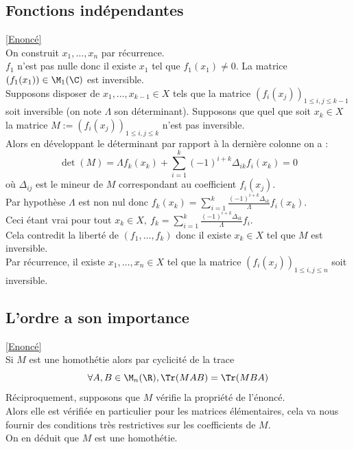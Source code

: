 \documentclass[8pt]{book}
\begin{document}
	\subsection{Fonctions indépendantes }
	\label{Fonctions indépendantes corrigé}
	\textcolor{blue}{\hyperref[Fonctions indépendantes]{[Enoncé]}}\\
	On construit $x_1,\dots,x_n$ par récurrence.\\
	$f_1$ n'est pas nulle donc il existe $x_1$ tel que $f_1(x_1)\ne 0$. La matrice $(f_1(x_1))\in \M_1(\C)$ est inversible.\\
	Supposons disposer de $x_1,\dots,x_{k-1}\in X$ tels que la matrice $(f_i(x_j))_{1\leq i,j\leq k-1}$ soit inversible (on note $\Lambda$ son déterminant). Supposons que quel que soit $x_k\in X$ la matrice $M:=(f_i(x_j))_{1\leq i,j\leq k}$ n'est pas inversible.\\
	Alors en développant le déterminant par rapport à la dernière colonne on a :
	$$\det(M)=\Lambda f_k(x_k)+\sum_{i=1}^k(-1)^{i+k}\Delta_{ik}f_i(x_k)=0$$
	où $\Delta_{ij}$ est le mineur de $M$ correspondant au coefficient $f_i(x_j)$.\\
	Par hypothèse $\Lambda$ est non nul donc $f_k(x_k)=\displaystyle\sum_{i=1}^k\frac{(-1)^{i+k}\Delta_{ik}}{\Lambda}f_i(x_k)$.\\
	Ceci étant vrai pour tout $x_k\in X,\ f_k=\displaystyle\sum_{i=1}^k\frac{(-1)^{i+k}\Delta_{ik}}{\Lambda}f_i$.\\
	Cela contredit la liberté de $(f_1,\dots,f_k)$ donc il existe $x_k\in X$ tel que $M$ est inversible.\\
	Par récurrence, il existe $x_1,\dots,x_n\in X$ tel que la matrice $(f_i(x_j))_{1\leq i,j\leq n}$ soit inversible.
	
	\subsection{L'ordre a son importance }
	\label{L'ordre a son importance corrigé}
	\textcolor{blue}{\hyperref[L'ordre a son importance]{[Enoncé]}}\\
	Si $M$ est une homothétie alors par cyclicité de la trace \[\forall A,B\in \M_n(\R), \Tr(MAB)= \Tr(MBA)\]
	Réciproquement, supposons que $M$ vérifie la propriété de l'énoncé.\\
	Alors elle est vérifiée en particulier pour les matrices élémentaires, cela va nous fournir des conditions très restrictives sur les coefficients de $M$.\\ On en déduit que $M$ est une homothétie.
	
\end{document}
